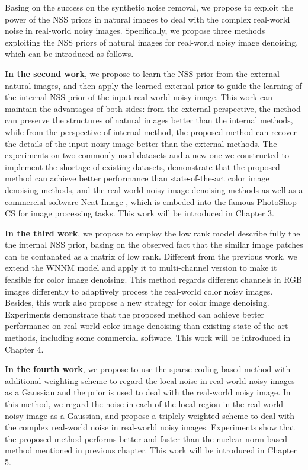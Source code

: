 Basing on the success on the synthetic noise removal, we propose to exploit the power of the NSS priors in natural images to deal with the complex real-world noise in real-world noisy images. Specifically, we propose three methods exploiting the NSS priors of natural images for real-world noisy image denoising, which can be introduced as follows.

\textbf{In the second work}, we propose to learn the NSS prior from the external natural images, and then apply the learned external prior to guide the learning of the internal NSS prior of the input real-world noisy image. This work can maintain the advantages of both sides: from the external perspective, the method can preserve the structures of natural images better than the internal methods, while from the perspective of internal method, the proposed method can recover the details of the input noisy image better than the external methods. The experiments on two commonly used datasets and a new one we constructed to implement the shortage of existing datasets, demonstrate that the proposed method can achieve better performance than state-of-the-art color image denoising methods, and the real-world noisy image denoising methods as well as a commercial software Neat Image \cite{neatimage}, which is embeded into the famous PhotoShop CS for image processing tasks. This work will be introduced in Chapter 3.


\textbf{In the third work}, we propose to employ the low rank model describe fully the the internal NSS prior, basing on the observed fact that the similar image patches can be contanated as a matrix of low rank. Different from the previous work, we extend the WNNM model and apply it to multi-channel version to make it feasible for color image denoising. This method regards different channels in RGB images differently to adaptively process the real-world color noisy images. Besides, this work also propose a new strategy for color image denoising. Experiments demonstrate that the proposed method can achieve better performance on real-world color image denoising than existing state-of-the-art methods, including some commercial software. This work will be introduced in Chapter 4.


\textbf{In the fourth work}, we propose to use the sparse coding based method with additional weighting scheme to regard the local noise in real-world noisy images as a Gaussian and the prior is used to deal with the real-world noisy image. In this method, we regard the noise in each of the local region in the real-world noisy image as a Gaussian, and propose a triplely weighted scheme to deal with the complex real-world noise in real-world noisy images. Experiments show that the proposed method performs better and faster than the nuclear norm based method mentioned in previous chapter. This work will be introduced in Chapter 5.


